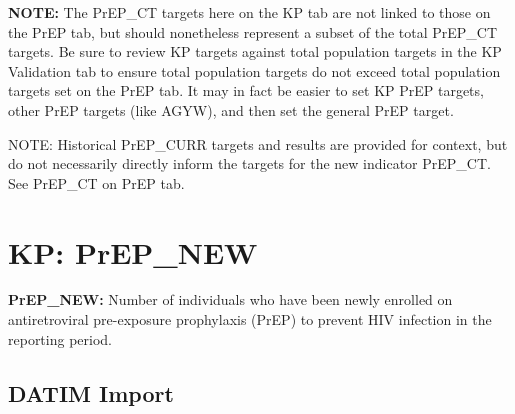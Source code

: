 \documentclass[
  openany]{book}
\begin{document}
\textbf{NOTE:} The PrEP\_CT targets here on the KP tab are not linked to those
on the PrEP tab, but should nonetheless represent a subset of the total
PrEP\_CT targets. Be sure to review KP targets against total population
targets in the KP Validation tab to ensure total population targets do
not exceed total population targets set on the PrEP tab. It may in fact
be easier to set KP PrEP targets, other PrEP targets (like AGYW), and
then set the general PrEP target.

NOTE: Historical PrEP\_CURR targets and results are provided for context,
but do not necessarily directly inform the targets for the new indicator
PrEP\_CT. See PrEP\_CT on PrEP tab.

\hypertarget{kp-prep_new}{%
\section{KP: PrEP\_NEW}\label{kp-prep_new}}

\textbf{PrEP\_NEW:} Number of individuals who have been newly enrolled on
antiretroviral pre-exposure prophylaxis (PrEP) to prevent HIV infection
in the reporting period.

\begin{table}
\centering\begingroup\fontsize{12}{14}\selectfont

\endgroup{}
\end{table}

\hypertarget{datim-import-34}{%
\subsection{DATIM Import}\label{datim-import-34}}
\end{document}

